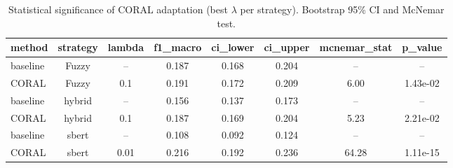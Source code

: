 \begin{table}[htbp]
\caption{Statistical significance of CORAL adaptation (best $\lambda$ per strategy). Bootstrap 95\% CI and McNemar test.}
\label{tab:coral_stats}
\begin{tabular}{lccccccc}
\toprule
method & strategy & lambda & f1\_macro & ci\_lower & ci\_upper & mcnemar\_stat & p\_value \\
\midrule
baseline & Fuzzy & -- & 0.187 & 0.168 & 0.204 & -- & -- \\
CORAL & Fuzzy & 0.1 & 0.191 & 0.172 & 0.209 & 6.00 & 1.43e-02 \\
baseline & hybrid & -- & 0.156 & 0.137 & 0.173 & -- & -- \\
CORAL & hybrid & 0.1 & 0.187 & 0.169 & 0.204 & 5.23 & 2.21e-02 \\
baseline & sbert & -- & 0.108 & 0.092 & 0.124 & -- & -- \\
CORAL & sbert & 0.01 & 0.216 & 0.192 & 0.236 & 64.28 & 1.11e-15 \\
\bottomrule
\end{tabular}
\end{table}
